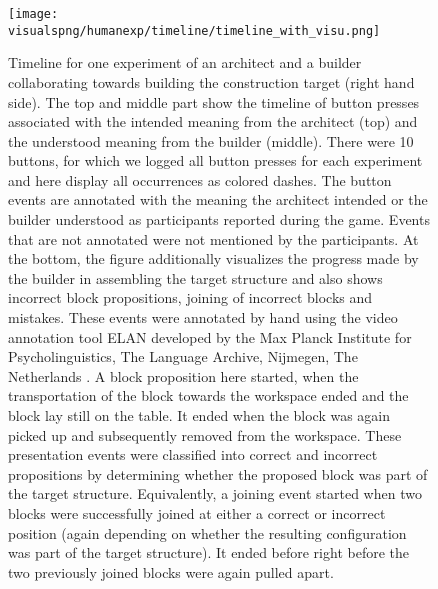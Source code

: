 \begin{figure}[!htbp]
\begin{widepage}
\centering
\texttt{[image: \\visualspng/humanexp/timeline/timeline\_with\_visu.png]}
\end{widepage}
\caption{Timeline for one experiment of an architect and a builder collaborating towards building the construction target (right hand side). The top and middle part show the timeline of button presses associated with the intended meaning from the architect (top) and the understood meaning from the builder (middle). There were 10 buttons, for which we logged all button presses for each experiment and here display all occurrences as colored dashes. The button events are annotated with the meaning the architect intended or the builder understood as participants reported during the game. Events that are not annotated were not mentioned by the participants. At the bottom, the figure additionally visualizes the progress made by the builder in assembling the target structure and also shows incorrect block propositions, joining of incorrect blocks and mistakes. These events were annotated by hand using the video annotation tool ELAN developed by the Max Planck Institute for Psycholinguistics, The Language Archive, Nijmegen, The Netherlands \cite{wittenburg2006elan}. A block proposition here started, when the transportation of the block towards the workspace ended and the block lay still on the table. It ended when the block was again picked up and subsequently removed from the workspace. These presentation events were classified into correct and incorrect propositions by determining whether the proposed block was part of the target structure. Equivalently, a joining event started when two blocks were successfully joined at either a correct or incorrect position (again depending on whether the resulting configuration was part of the target structure). It ended before right before the two previously joined blocks were again pulled apart.}
\label{fig:timeline}
\end{figure}

